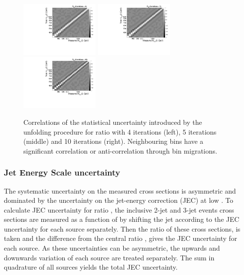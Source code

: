 \begin{figure}[!htbp]
  \begin{center}
    \includegraphics[width=0.35\textwidth]{Plots_HT_2_150/Correlation_Matrix_NLO_Ratio_32_ite4.pdf}%
    \includegraphics[width=0.35\textwidth]{Plots_HT_2_150/Correlation_Matrix_NLO_Ratio_32_ite5.pdf}%
    \includegraphics[width=0.35\textwidth]{Plots_HT_2_150/Correlation_Matrix_NLO_Ratio_32_ite10.pdf}\\
    \caption{Correlations of the statistical uncertainty introduced by the unfolding procedure for ratio \ratio with 4 iterations (left), 5 iterations (middle) and 10 iterations (right). Neighbouring bins have a significant correlation or anti-correlation through bin migrations.}
    \label{fig:corr_ratio}
  \end{center}
\end{figure}

\subsubsection{Jet Energy Scale uncertainty}
The systematic uncertainty on the measured cross sections is asymmetric and dominated by the uncertainty on the jet-energy correction (JEC) at low \httwo. To calculate JEC uncertainty for ratio \ratio, the inclusive 2-jet and 3-jet events cross sections are measured as a function of \httwo by shifting the jet \pt according to the JEC uncertainty for each source separately. Then the ratio of these cross sections, \ratio is taken and the difference from the central ratio \ratio, gives the JEC uncertainty for each source. As these uncertainties can be asymmetric, the upwards and downwards variation of each source are treated separately. The sum in quadrature of all sources yields the total JEC uncertainty.

